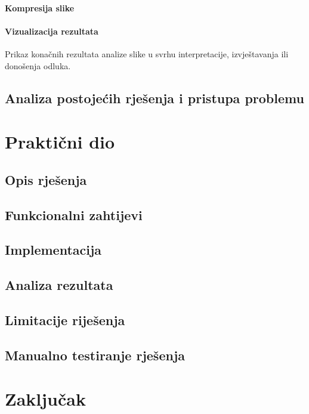 \documentclass{foi}
\begin{document}
\subsubsection{Kompresija slike}

\subsubsection{Vizualizacija rezultata}
Prikaz konačnih rezultata analize slike u svrhu interpretacije, izvještavanja ili donošenja odluka.

\section{Analiza postojećih rješenja i pristupa problemu}

\chapter{Praktični dio}
\section{Opis rješenja}
\section{Funkcionalni zahtijevi}
\section{Implementacija}
\section{Analiza rezultata}
\section{Limitacije riješenja}
\section{Manualno testiranje rješenja}
\chapter{Zaključak}


\printbibliography[title=Popis literature]

\listoffigures
{}
 
\listoftables
{}

\appendix
\renewcommand{\thechapter}{\arabic{chapter}}
\end{document}

